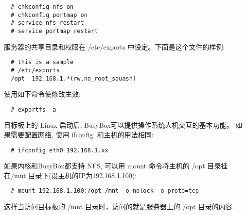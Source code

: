 \begin{boxedminipage}{.9\textwidth}
\begin{verbatim}
  # chkconfig nfs on
  # chkconfig portmap on
  # service nfs restart
  # service portmap restart
\end{verbatim}
\end{boxedminipage}

服务器的共享目录和权限在 /etc/exports 中设定。下面是这个文件的样例:

\begin{boxedminipage}{.9\textwidth}
\begin{verbatim}
  # this is a sample
  # /etc/exports
  /opt  192.168.1.*(rw,no_root_squash)
\end{verbatim}
\end{boxedminipage}

使用如下命令使修改生效:

\begin{boxedminipage}{.9\textwidth}
\begin{verbatim}
  # exportfs -a
\end{verbatim}
\end{boxedminipage}

    目标板上的 Linux 启动后, BusyBox可以提供操作系统人机交互的基本功能。
如果需要配置网络, 使用 ifconfig, 和主机的用法相同:

\begin{boxedminipage}{.9\textwidth}
\begin{verbatim}
  # ifconfig eth0 192.168.1.xx
\end{verbatim}
\end{boxedminipage}

如果内核和BusyBox都支持 NFS, 可以用 mount 命令将主机的 /opt 目录挂在/mnt 
目录下(设主机的IP为192.168.1.100):

\begin{boxedminipage}{.9\textwidth}
\begin{verbatim}
  # mount 192.168.1.100:/opt /mnt -o nolock -o proto=tcp
\end{verbatim}
\end{boxedminipage}

 这样当访问目标板的 /mnt 目录时，访问的就是服务器上的 /opt 目录的内容.

